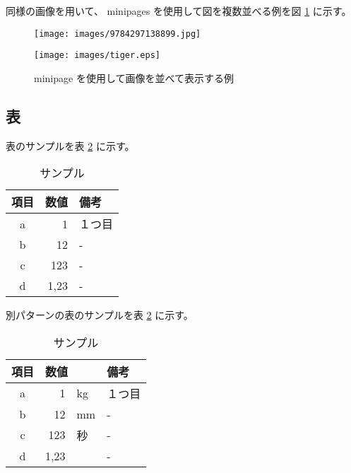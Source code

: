 \documentclass[a4paper]{ltjsarticle}
\begin{document}
同様の画像を用いて、
minipages を使用して図を複数並べる例を図 \ref{fig:minipages} に示す。

\begin{figure}[htbp]
  \begin{minipage}[b]{0.45\linewidth}
    \centering
    \texttt{[image: images/9784297138899.jpg]}
  \end{minipage}
  \begin{minipage}[b]{0.45\linewidth}
    \centering
    \texttt{[image: images/tiger.eps]}
  \end{minipage}
  \caption{minipage を使用して画像を並べて表示する例}
  \label{fig:minipages}
\end{figure}

\subsection{表}

表のサンプルを表 \ref{tbl:sample} に示す。

\begin{table}[H]
\centering
\caption{サンプル}
\begin{tabular}{crp{6cm}}
        項目 & 数値 & 備考 \\
        \hline
        a &    1 & １つ目 \\
        b &   12 & - \\
        c &  123 & - \\
        d & 1,23 & - \\
\end{tabular}
\label{tbl:sample}
\end{table}

別パターンの表のサンプルを表 \ref{tbl:sample} に示す。

\begin{table}[H]
\centering
\caption{サンプル}
\begin{tabular}{crlp{6cm}}
        項目 & \multicolumn{2}{l}{数値} & 備考 \\
        \hline
        a &    1 & kg & １つ目 \\
        b &   12 & mm & - \\
        c &  123 & 秒 & - \\
        d & 1,23 & & -  \\
\end{tabular}
\label{tbl:sample}
\end{table}
\end{document}
